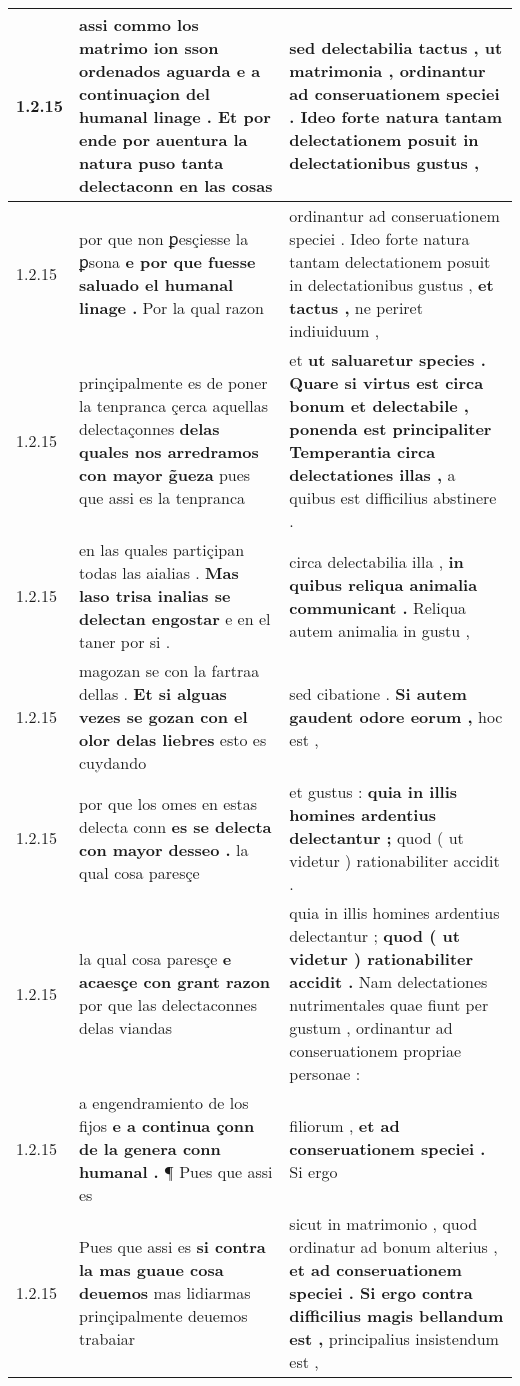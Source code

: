 \begin{tabular}{|p{1cm}|p{6.5cm}|p{6.5cm}|}
1.2.15 & assi commo los matrimo ion sson ordenados aguarda \textbf{ e a continuaçion del humanal linage . } Et por ende por auentura la natura puso tanta delectaconn en las cosas & sed delectabilia tactus , \textbf{ ut matrimonia , } ordinantur ad conseruationem speciei . Ideo forte natura tantam delectationem posuit in delectationibus gustus , \\\hline
1.2.15 & por que non ꝑesçiesse la ꝑsona \textbf{ e por que fuesse saluado el humanal linage . } Por la qual razon & ordinantur ad conseruationem speciei . Ideo forte natura tantam delectationem posuit in delectationibus gustus , \textbf{ et tactus , } ne periret indiuiduum , \\\hline
1.2.15 & prinçipalmente es de poner la tenpranca çerca aquellas delectaçonnes \textbf{ delas quales nos arredramos con mayor g̃ueza } pues que assi es la tenpranca & et \textbf{ ut saluaretur species . Quare si virtus est circa bonum et delectabile , ponenda est principaliter Temperantia circa delectationes illas , } a quibus est difficilius abstinere . \\\hline
1.2.15 & en las quales partiçipan todas las aialias . \textbf{ Mas laso trisa inalias se delectan engostar } e en el taner por si . & circa delectabilia illa , \textbf{ in quibus reliqua animalia communicant . } Reliqua autem animalia in gustu , \\\hline
1.2.15 & magozan se con la fartraa dellas . \textbf{ Et si alguas vezes se gozan con el olor delas liebres } esto es cuydando & sed cibatione . \textbf{ Si autem gaudent odore eorum , } hoc est , \\\hline
1.2.15 & por que los omes en estas delecta conn \textbf{ es se delecta con mayor desseo . } la qual cosa paresçe & et gustus : \textbf{ quia in illis homines ardentius delectantur ; } quod ( ut videtur ) rationabiliter accidit . \\\hline
1.2.15 & la qual cosa paresçe \textbf{ e acaesçe con grant razon } por que las delectaconnes delas viandas & quia in illis homines ardentius delectantur ; \textbf{ quod ( ut videtur ) rationabiliter accidit . } Nam delectationes nutrimentales quae fiunt per gustum , ordinantur ad conseruationem propriae personae : \\\hline
1.2.15 & a engendramiento de los fijos \textbf{ e a continua çonn de la genera conn humanal . } ¶ Pues que assi es & filiorum , \textbf{ et ad conseruationem speciei . } Si ergo \\\hline
1.2.15 & Pues que assi es \textbf{ si contra la mas guaue cosa deuemos } mas lidiarmas prinçipalmente deuemos trabaiar & sicut in matrimonio , quod ordinatur ad bonum alterius , \textbf{ et ad conseruationem speciei . Si ergo contra difficilius magis bellandum est , } principalius insistendum est , \\\hline

\end{tabular}
